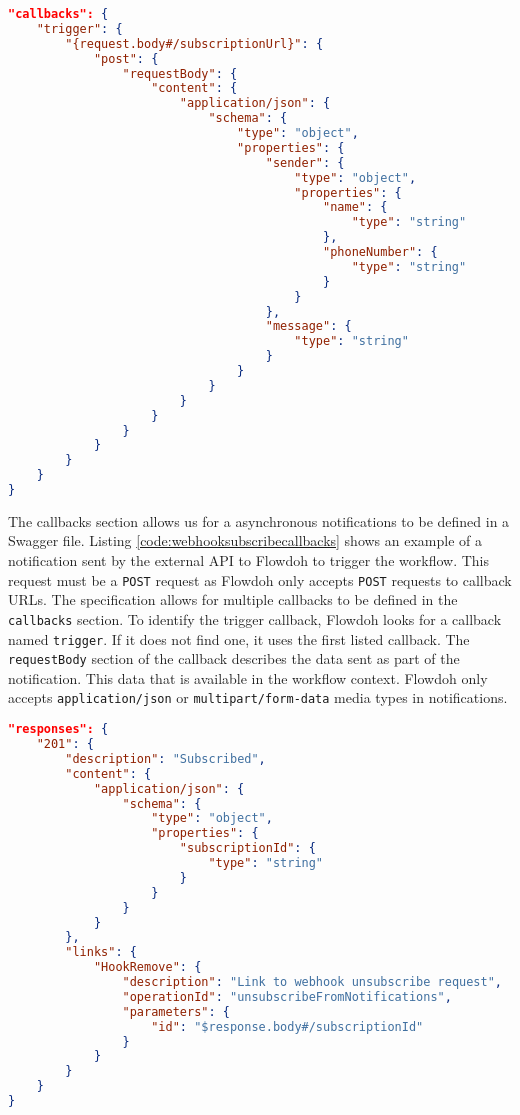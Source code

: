 \begin{lstlisting}[caption={Webhook subscribe request - the callbacks section},label={code:webhooksubscribecallbacks},language=json]
"callbacks": {
    "trigger": {
        "{request.body#/subscriptionUrl}": {
            "post": {
                "requestBody": {
                    "content": {
                        "application/json": {
                            "schema": {
                                "type": "object",
                                "properties": {
                                    "sender": {
                                        "type": "object",
                                        "properties": {
                                            "name": {
                                                "type": "string"
                                            },
                                            "phoneNumber": {
                                                "type": "string"
                                            }
                                        }
                                    },
                                    "message": {
                                        "type": "string"
                                    }
                                }
                            }
                        }
                    }
                }
            }
        }
    }
}
\end{lstlisting}
The callbacks section allows us for a asynchronous notifications to be defined in a Swagger file. Listing \ref{code:webhooksubscribecallbacks} shows an example of a notification sent by the external API to Flowdoh to trigger the workflow. This request must be a \texttt{POST} request as Flowdoh only accepts \texttt{POST} requests to callback URLs. The specification allows for multiple callbacks to be defined in the \texttt{callbacks} section. To identify the trigger callback, Flowdoh looks for a callback named \texttt{trigger}. If it does not find one, it uses the first listed callback. The \texttt{requestBody} section of the callback describes the data sent as part of the notification. This data that is available in the workflow context. Flowdoh only accepts \texttt{application/json} or \texttt{multipart/form-data} media types in notifications.
\begin{lstlisting}[caption={Webhook subscribe request - the responses section},label={code:webhooksubscriberesponses},language=json]
"responses": {
    "201": {
        "description": "Subscribed",
        "content": {
            "application/json": {
                "schema": {
                    "type": "object",
                    "properties": {
                        "subscriptionId": {
                            "type": "string"
                        }
                    }
                }
            }
        },
        "links": {
            "HookRemove": {
                "description": "Link to webhook unsubscribe request",
                "operationId": "unsubscribeFromNotifications",
                "parameters": {
                    "id": "$response.body#/subscriptionId"
                }
            }
        }
    }
}
\end{lstlisting}
